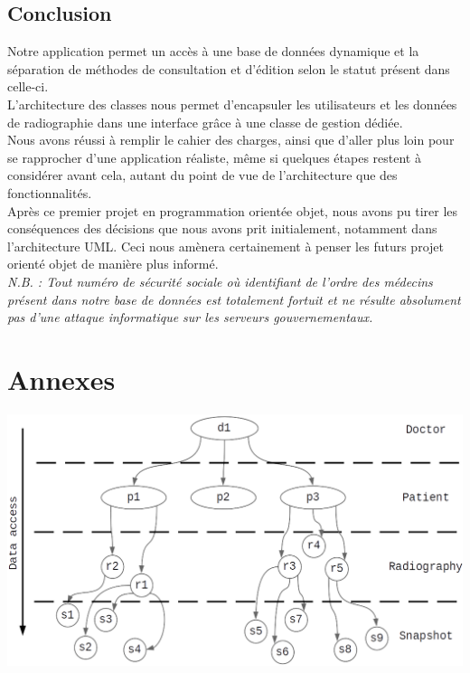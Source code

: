 \documentclass[12pt,a4paper]{article}
\newenvironment{Figure}
{\par\medskip\noindent\minipage{\linewidth}}
{\endminipage\par\medskip}
\begin{document}
\begin{multicols}{2}
		\section{Conclusion}
		
		Notre application permet un accès à une base de données dynamique et la séparation de méthodes de consultation et d'édition selon le statut présent dans celle-ci. \\
		
		L'architecture des classes nous permet d'encapsuler les utilisateurs et les données de radiographie dans une interface grâce à une classe de gestion dédiée. \\
		
		Nous avons réussi à remplir le cahier des charges, ainsi que d'aller plus loin pour se rapprocher d'une application réaliste, même si quelques étapes restent à considérer avant cela, autant du point de vue de l'architecture que des fonctionnalités. \\
		
		Après ce premier projet en programmation orientée objet, nous avons pu tirer les conséquences des décisions que nous avons prit initialement, notamment dans l'architecture UML. Ceci nous amènera certainement à penser les futurs projet orienté objet de manière plus informé. \\
		
		\textit{N.B. : Tout numéro de sécurité sociale où identifiant de l'ordre des médecins présent dans notre base de données est totalement fortuit et ne résulte absolument pas d'une attaque informatique sur les serveurs gouvernementaux.} \\
		
	\end{multicols}

	
	\section{Annexes}
	
	\begin{Figure}
		\centering
		\includegraphics[width=0.7\linewidth]{images/structure.png}
		\label{fig:structure}
	\end{Figure}
	
\end{document}
